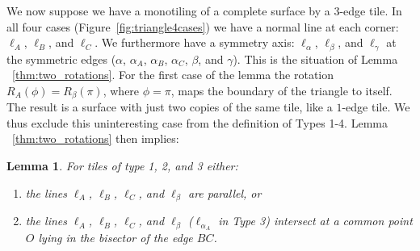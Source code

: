 \documentclass[11pt]{amsart}
\newtheorem{lemma}[theorem]{Lemma}
\theoremstyle{remark}
\newcounter{case}
\begin{document}
We now suppose we have a monotiling of a complete surface by a 3-edge tile. 
In all four cases (Figure~\ref{fig:triangle4cases}) we have a normal line at each corner: $\ell_A$,
$\ell_B$, and $\ell_C$. We furthermore have a symmetry axis:
$\ell_{\alpha}$, $\ell_{\beta}$, and $\ell_{\gamma}$ at the symmetric
edges ($\alpha$, $\alpha_A$, $\alpha_B$, $\alpha_C$, $\beta$, and
$\gamma$). 
This is the situation of Lemma ~\ref{thm:two_rotations}. For the first case of the lemma
 the rotation $R_A(\phi)=R_{\beta}(\pi)$,
  where $\phi=\pi$, maps the boundary of the triangle to itself. The result is a surface with just two
  copies of the same tile, like a $1$-edge tile. 
  We thus exclude this uninteresting case from the definition of Types 1-4.  
  Lemma ~\ref{thm:two_rotations} then implies:
\begin{lemma}
  \label{lemma:normals}
  For tiles of type 1, 2, and 3 either:
  \begin{enumerate}
  \item the lines $\ell_A$, $\ell_B$, $\ell_C$, and $\ell_{\beta}$
    are parallel, or
  \item the lines $\ell_A$, $\ell_B$, $\ell_C$, and $\ell_{\beta}$
    ($\ell_{\alpha_A}$ in Type 3)
    intersect at a common point $O$ lying in the bisector of the edge
    $BC$.
  \end{enumerate}
\end{lemma}
\end{document}
